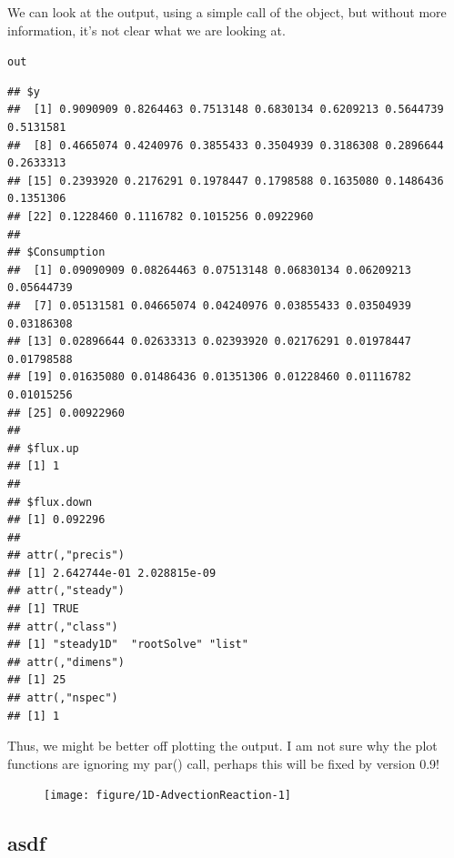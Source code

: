 \documentclass{tufte-handout}\usepackage[]{graphicx}\usepackage[]{xcolor}
\makeatletter
\newcommand{\hlstd}[1]{\textcolor[rgb]{0.345,0.345,0.345}{#1}}%
\newenvironment{kframe}{%
 \def\at@end@of@kframe{}%
 \ifinner\ifhmode%
  \def\at@end@of@kframe{\end{minipage}}%
  \begin{minipage}{\columnwidth}%
 \fi\fi%
 \def\FrameCommand##1{\hskip\@totalleftmargin \hskip-\fboxsep
 \colorbox{shadecolor}{##1}\hskip-\fboxsep
     \hskip-\linewidth \hskip-\@totalleftmargin \hskip\columnwidth}%
 \MakeFramed {\advance\hsize-\width
   \@totalleftmargin\z@ \linewidth\hsize
   \@setminipage}}%
 {\par\unskip\endMakeFramed%
 \at@end@of@kframe}
\newenvironment{knitrout}{}{} %
\makeatother
\begin{document}
We can look at the output, using a simple call of the object, but without more information, it's not clear what we are looking at. 
\begin{knitrout}
\color{fgcolor}\begin{kframe}
\begin{alltt}
\hlstd{out}
\end{alltt}
\begin{verbatim}
## $y
##  [1] 0.9090909 0.8264463 0.7513148 0.6830134 0.6209213 0.5644739 0.5131581
##  [8] 0.4665074 0.4240976 0.3855433 0.3504939 0.3186308 0.2896644 0.2633313
## [15] 0.2393920 0.2176291 0.1978447 0.1798588 0.1635080 0.1486436 0.1351306
## [22] 0.1228460 0.1116782 0.1015256 0.0922960
## 
## $Consumption
##  [1] 0.09090909 0.08264463 0.07513148 0.06830134 0.06209213 0.05644739
##  [7] 0.05131581 0.04665074 0.04240976 0.03855433 0.03504939 0.03186308
## [13] 0.02896644 0.02633313 0.02393920 0.02176291 0.01978447 0.01798588
## [19] 0.01635080 0.01486436 0.01351306 0.01228460 0.01116782 0.01015256
## [25] 0.00922960
## 
## $flux.up
## [1] 1
## 
## $flux.down
## [1] 0.092296
## 
## attr(,"precis")
## [1] 2.642744e-01 2.028815e-09
## attr(,"steady")
## [1] TRUE
## attr(,"class")
## [1] "steady1D"  "rootSolve" "list"     
## attr(,"dimens")
## [1] 25
## attr(,"nspec")
## [1] 1
\end{verbatim}
\end{kframe}
\end{knitrout}

Thus, we might be better off plotting the output. I am not sure why the plot functions are ignoring my par() call, perhaps this will be fixed by version 0.9!

\begin{figure}
\begin{knitrout}
\color{fgcolor}
\texttt{[image: figure/1D-AdvectionReaction-1]} 
\end{knitrout}
\end{figure}

\subsection{asdf}
\end{document}
